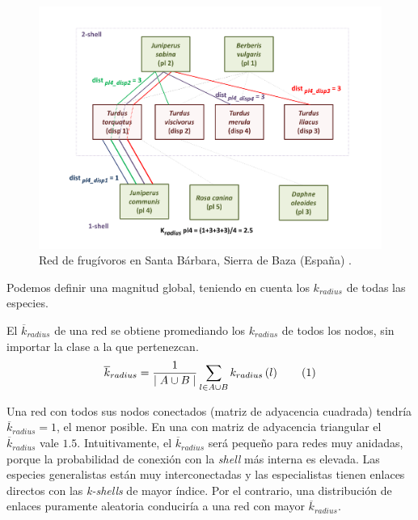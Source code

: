 \begin{figure}[h!]
\centering
\includegraphics[scale=0.5]{Figures/ESTATICA_SD_030_example_distances.pdf}
\caption {Red de frugívoros en Santa Bárbara, Sierra de Baza (España) \cite{jordano1993geographical}.}
\label{fig:ESTATICA_SD_030_example_distances}
\end{figure}

Podemos definir una magnitud global, teniendo en cuenta los $k_{radius}$ de todas las especies.

\begin{theo} 
El \textit{$\overline k_{radius}$} de una red se obtiene promediando los ${k}_{radius}$ de todos los nodos, sin importar la clase a la que pertenezcan.
\begin{align*}
\displaystyle
\overline {k}_{radius} = \frac{1}{\mid A \cup B \mid}\sum\limits_{l \in A \cup B} k_{radius}\left(l\right)
\stepcounter{equation}\tag{\theequation}\label{avgkradius}
\end{align*}
\label{ESTATICA_avgkradius}
\end{theo}

Una red con todos sus nodos conectados (matriz de adyacencia cuadrada) tendría $\overline {k}_{radius}=1$, el menor posible. En una con matriz de adyacencia triangular el $\overline {k}_{radius}$ vale $1.5$. Intuitivamente, el $\overline {k}_{radius}$ será pequeño para redes muy anidadas, porque la probabilidad de conexión con la \textit{shell} más interna es elevada. Las especies generalistas están muy interconectadas y las especialistas tienen enlaces directos con las \textit{k-shells} de mayor índice. Por el contrario, una distribución de enlaces puramente aleatoria conduciría a una red con mayor $\overline {k}_{radius}$.

